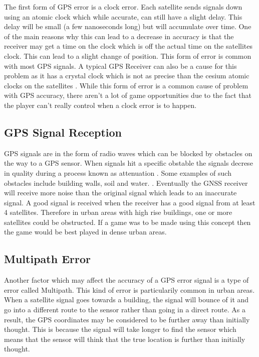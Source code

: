 \documentclass{l4proj}
\begin{document}
The first form of GPS error is a clock error. Each satellite sends signals down using an atomic clock which while accurate, can still have a 
slight delay. This delay will be small (a few nanoseconds long) but will accumulate over time. One of the main reasons why this can lead to
a decrease in accuracy is that the receiver may get a time on the clock which is off the actual time on the satellites clock. This can lead to
a slight change of position. This form of error is common with most GPS signals. A typical GPS Receiver can also be a cause for this problem as it 
has a crystal clock which is not as precise than the cesium atomic clocks on the satellites \citep{Rabbany2006, Kleusberg1990}. While this
form of error is a common cause of problem with GPS accuracy, there aren't a lot of game opportunities due to the fact that the player
can't really control when a clock error is to happen.

\subsection{GPS Signal Reception}
GPS signals are in the form of radio waves which can be blocked by obstacles on the way to a GPS sensor. When signals hit a specific obstable
the signals decrese in quality during a process known as attenuation \citep{Indoor2010}. Some examples of such obstacles include
building walls, soil and water. \citep{Kleusberg1990}. Eventually the GNSS receiver will receive more noise
than the original signal which leads to an inaccurate signal. A good signal is received when the receiver has a good signal from at least 4
satellites. Therefore in urban areas with high rise buildings, one or more satellites could be obstructed. If a game was to be made
using this concept then the game would be best played in dense urban areas.

\subsection{Multipath Error}
Another factor which may affect the accuracy of a GPS error signal is a type of error called Multipath. This kind of error is particularily
common in urban areas. When a satellite signal goes towards a building, the signal will bounce of it and go into a different route to the
sensor rather than going in a direct route. As a result, the GPS coordinates may be considered to be further away than initially thought.
This is because the signal will take longer to find the sensor which means that the sensor will think that the true location is further than
initially thought.
\end{document}
